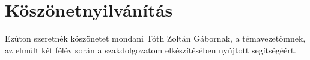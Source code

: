 \chapter*{Köszönetnyilvánítás}

Ezúton szeretnék köszönetet mondani Tóth Zoltán Gábornak, a témavezetőmnek, az elmúlt két félév során a szakdolgozatom elkészítésében nyújtott segítségéért.